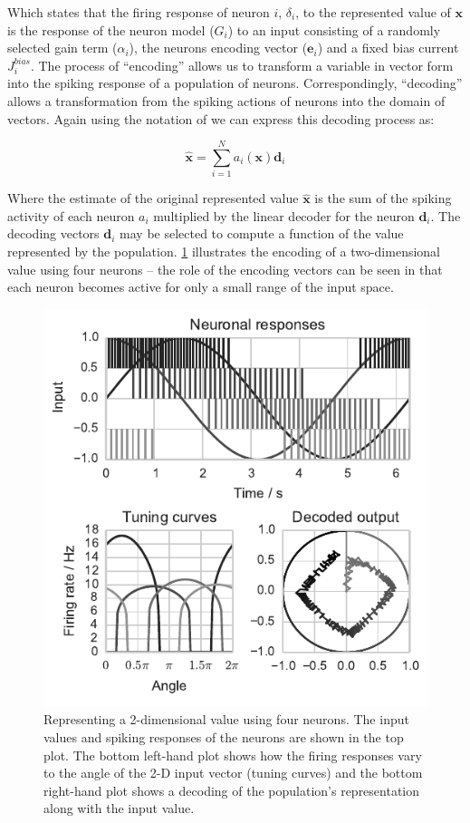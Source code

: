 \documentclass[conference]{IEEEtran}
\renewcommand{\vec}{\mathbf}  %
\begin{document}
Which states that the firing response of neuron $i$, $\delta_i$, to the represented value of $\vec{x}$ is the response of the neuron model ($G_{i}$) to an input consisting of a randomly selected gain term ($\alpha_i$), the neurons encoding vector ($\vec{e}_i$) and a fixed bias current $J^{bias}_i$. The process of ``encoding'' allows us to transform a variable in vector form into the spiking response of a population of neurons. Correspondingly, ``decoding'' allows a transformation from the spiking actions of neurons into the domain of vectors. Again using the notation of \textcite{Stewart2014} we can express this decoding process as:

\begin{equation}
  \vec{\hat{x}} = \sum\limits_{i=1}^{N} a_i(\vec{x})\vec{d}_i  \label{eq:decoding}
\end{equation}

Where the estimate of the original represented value $\vec{\hat{x}}$ is the sum of the spiking activity of each neuron $a_i$ multiplied by the linear decoder for the neuron $\vec{d}_i$. The decoding vectors $\vec{d}_i$ may be selected to compute a function of the value represented by the population. \figurename \ref{fig:background/nef-1} illustrates the encoding of a two-dimensional value using four neurons -- the role of the encoding vectors can be seen in that each neuron becomes active for only a small range of the input space.

  \begin{figure}[!t]
    \includegraphics{figures/nef-1}
    \caption{Representing a 2-dimensional value using four neurons. The input values and spiking responses of the neurons are shown in the top plot. The bottom left-hand plot shows how the firing responses vary to the angle of the 2-D input vector (tuning curves) and the bottom right-hand plot shows a decoding of the population's representation along with the input value.}
    \label{fig:background/nef-1}
  \end{figure}
\end{document}
